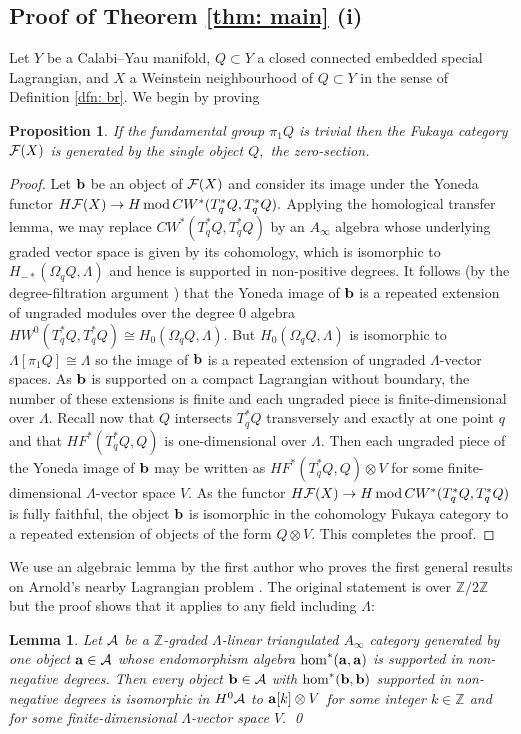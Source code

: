 \documentclass{article}
\DeclareMathOperator{\Mod}{mod}\DeclareMathOperator{\supp}{supp}\DeclareMathOperator{\obj}{obj}
\theoremstyle{plain}%
\newtheorem{prop}[thm]{Proposition}
\newtheorem{lem}[thm]{Lemma}
\theoremstyle{definition}
\numberwithin{equation}{section}
\numberwithin{figure}{section}
\def\l{\label}
\def\cA{{\mathbin{\cal A}}}
\def\cF{{\mathbin{\cal F}}}
\def\Z{{\mathbin{\mathbb Z}}}
\def\La{\Lambda}
\def\Om{\Omega}
\def\ot{\otimes}
\def\iy{\infty}
\begin{document}
\subsection{Proof of Theorem \ref{thm: main} (i)}\l{sec: proof main i}
Let $Y$ be a Calabi--Yau manifold, $Q\subset Y$ a closed connected embedded special Lagrangian, and $X$ a Weinstein neighbourhood of $Q\subset Y$ in the sense of Definition \ref{dfn: br}. We begin by proving
\begin{prop}\l{prop: pi1 triv}
If the fundamental group $\pi_1Q$ is trivial then the Fukaya category $\cF(X)$ is generated by the single object $Q,$ the zero-section.
\end{prop}
\begin{proof}
Let ${\mathbf{b}}$ be an object of $\cF(X)$ and consider its image under the Yoneda functor $H\cF(X)\to H \Mod CW^{*}(T_q^*Q, T_q^*Q ).$ Applying the homological transfer lemma, we may replace $  CW^{*}(T_q^*Q, T_q^*Q )$ by an $A_\infty$ algebra whose underlying graded vector space is given by its cohomology, which is isomorphic to $H_{-*}(\Om_qQ,\La)$ and hence  is supported in non-positive degrees. It follows (by the degree-filtration argument \cite[Appendix A]{Ab4}) that the Yoneda image of ${\mathbf{b}}$ is a repeated extension of ungraded modules over the degree $0$ algebra $  HW^{0}(T_q^*Q, T_q^*Q ) \cong H_0(\Om_qQ,\La).$
But $H_0(\Om_qQ,\La)$ is isomorphic to $\La[\pi_1Q]\cong\La$ so the image of ${\mathbf{b}}$  is a repeated extension of ungraded $\La$-vector spaces. 
As ${\mathbf{b}}$ is supported on a compact Lagrangian without boundary, the number of these extensions is finite and each ungraded piece is finite-dimensional over $\La.$
Recall now that $Q$ intersects $T_q^*Q$ transversely and exactly at one point $q$ and that $HF^*(T_q^*Q,Q)$ is one-dimensional over $\La.$
Then each ungraded piece of the Yoneda image of ${\mathbf{b}}$ may be written as $HF^*(T_q^*Q,Q)\otimes V$ for some finite-dimensional $\La$-vector space $V.$ 
As the functor $H\cF(X)\to H \Mod CW^{*}(T_q^*Q, T_q^*Q )$ is fully faithful, the object ${\mathbf{b}}$ is isomorphic in the cohomology Fukaya category to a repeated extension of objects of the form $Q\ot V.$
This completes the proof.  
\end{proof}

We use an algebraic lemma by the first author \cite[Lemma A.4]{Ab4} who proves the first general results on Arnold's nearby Lagrangian problem \cite{FSS2}. The original statement is over $\Z/2\Z$ but the proof shows that it applies to any field including $\La$:
\begin{lem}\l{lem: pi1 triv}
Let $\cA$ be a $\Z$-graded $\La$-linear triangulated $A_\iy$ category generated by one object $\mathbf{a}\in\cA$  whose endomorphism algebra $\hom^*({\bf a},{\bf a})$ is supported in non-negative degrees.
Then every object $\b\in \cA$ with $\hom^*({\mathbf{b}},{\mathbf{b}})$ supported in non-negative degrees
is isomorphic in $H^0\cA$ to ${\bf a}[k]\otimes V$ for some integer $k\in\Z$ and for some finite-dimensional $\La$-vector space $V.$
\qed
\end{lem}
\end{document}
